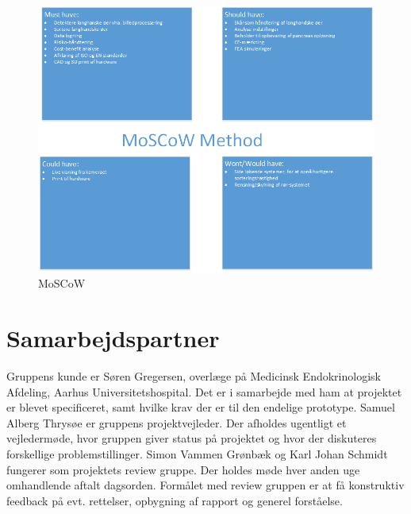 \begin{figure}[H]
	\centering
	\includegraphics[width=1\textwidth]{billeder/MoSCoW.png}
	\caption{MoSCoW}
	\label{fig:moscow}
\end{figure}

\section{Samarbejdspartner}
Gruppens kunde er Søren Gregersen, overlæge på Medicinsk Endokrinologisk Afdeling, Aarhus Universitetshospital. Det er i samarbejde med ham at projektet er blevet specificeret, samt hvilke krav der er til den endelige prototype.
Samuel Alberg Thrysøe er gruppens projektvejleder. Der afholdes ugentligt et vejledermøde, hvor gruppen giver status på projektet og hvor der diskuteres forskellige problemstillinger. 
Simon Vammen Grønbæk og Karl Johan Schmidt fungerer som projektets review gruppe. Der holdes møde hver anden uge omhandlende aftalt dagsorden. Formålet med review gruppen er at få konstruktiv feedback på evt. rettelser, opbygning af rapport og generel forståelse.

